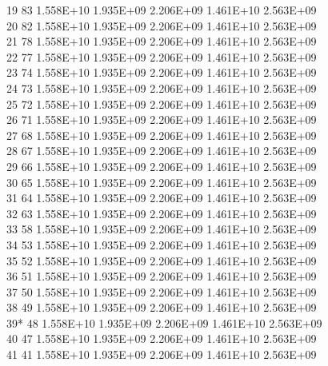 \documentclass[12pt]{article}
\begin{document}
   19       83   1.558E+10   1.935E+09   2.206E+09   1.461E+10   2.563E+09\\
   20       82   1.558E+10   1.935E+09   2.206E+09   1.461E+10   2.563E+09\\
   21       78   1.558E+10   1.935E+09   2.206E+09   1.461E+10   2.563E+09\\
   22       77   1.558E+10   1.935E+09   2.206E+09   1.461E+10   2.563E+09\\
   23       74   1.558E+10   1.935E+09   2.206E+09   1.461E+10   2.563E+09\\
   24       73   1.558E+10   1.935E+09   2.206E+09   1.461E+10   2.563E+09\\
   25       72   1.558E+10   1.935E+09   2.206E+09   1.461E+10   2.563E+09\\
   26       71   1.558E+10   1.935E+09   2.206E+09   1.461E+10   2.563E+09\\
   27       68   1.558E+10   1.935E+09   2.206E+09   1.461E+10   2.563E+09\\
   28       67   1.558E+10   1.935E+09   2.206E+09   1.461E+10   2.563E+09\\
   29       66   1.558E+10   1.935E+09   2.206E+09   1.461E+10   2.563E+09\\
   30       65   1.558E+10   1.935E+09   2.206E+09   1.461E+10   2.563E+09\\
   31       64   1.558E+10   1.935E+09   2.206E+09   1.461E+10   2.563E+09\\
   32       63   1.558E+10   1.935E+09   2.206E+09   1.461E+10   2.563E+09\\
   33       58   1.558E+10   1.935E+09   2.206E+09   1.461E+10   2.563E+09\\
   34       53   1.558E+10   1.935E+09   2.206E+09   1.461E+10   2.563E+09\\
   35       52   1.558E+10   1.935E+09   2.206E+09   1.461E+10   2.563E+09\\
   36       51   1.558E+10   1.935E+09   2.206E+09   1.461E+10   2.563E+09\\
   37       50   1.558E+10   1.935E+09   2.206E+09   1.461E+10   2.563E+09\\
   38       49   1.558E+10   1.935E+09   2.206E+09   1.461E+10   2.563E+09\\
   39*      48   1.558E+10   1.935E+09   2.206E+09   1.461E+10   2.563E+09\\
   40       47   1.558E+10   1.935E+09   2.206E+09   1.461E+10   2.563E+09\\
   41       41   1.558E+10   1.935E+09   2.206E+09   1.461E+10   2.563E+09\\
\end{document}
